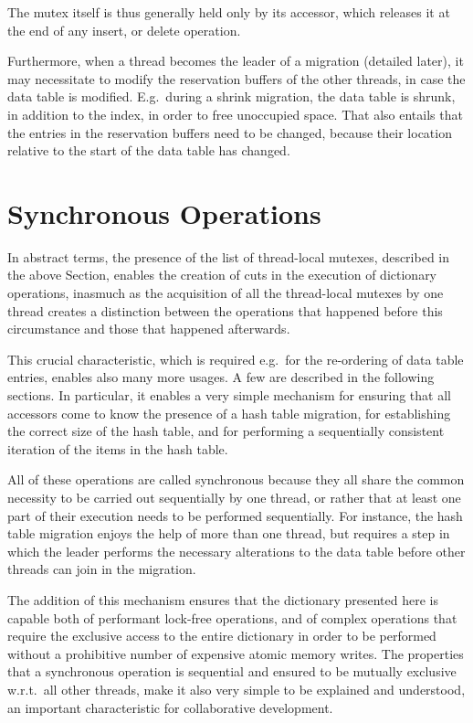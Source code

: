 The mutex itself is thus generally held only by its accessor, which releases it at the end of any insert, or delete operation.

Furthermore, when a thread becomes the leader of a migration (detailed later), it may necessitate to modify the reservation buffers of the other threads, in case the data table is modified.
E.g.\ during a shrink migration, the data table is shrunk, in addition to the index, in order to free unoccupied space.
That also entails that the entries in the reservation buffers need to be changed, because their location relative to the start of the data table has changed.


\section{Synchronous Operations}\label{sec:synchronous-operations}

In abstract terms, the presence of the list of thread-local mutexes, described in the above Section, enables the creation of cuts in the execution of dictionary operations, inasmuch as the acquisition of all the thread-local mutexes by one thread creates a distinction between the operations that happened before this circumstance and those that happened afterwards.

This crucial characteristic, which is required e.g.\ for the re-ordering of data table entries, enables also many more usages.
A few are described in the following sections.
In particular, it enables a very simple mechanism for ensuring that all accessors come to know the presence of a hash table migration, for establishing the correct size of the hash table, and for performing a sequentially consistent iteration of the items in the hash table.

All of these operations are called synchronous because they all share the common necessity to be carried out sequentially by one thread, or rather that at least one part of their execution needs to be performed sequentially.
For instance, the hash table migration enjoys the help of more than one thread, but requires a step in which the leader performs the necessary alterations to the data table before other threads can join in the migration.

The addition of this mechanism ensures that the dictionary presented here is capable both of performant lock-free operations, and of complex operations that require the exclusive access to the entire dictionary in order to be performed without a prohibitive number of expensive atomic memory writes.
The properties that a synchronous operation is sequential and ensured to be mutually exclusive w.r.t.\ all other threads, make it also very simple to be explained and understood, an important characteristic for collaborative development.

